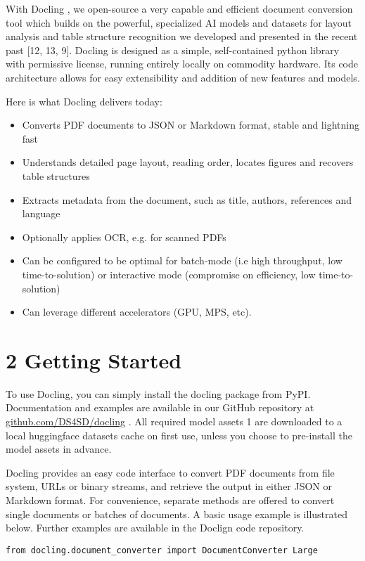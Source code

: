 \documentclass[11pt,a4paper]{article}
\begin{document}
With Docling , we open-source a very capable and efficient document conversion tool which builds on the powerful, specialized AI models and datasets for layout analysis and table structure recognition we developed and presented in the recent past [12, 13, 9]. Docling is designed as a simple, self-contained python library with permissive license, running entirely locally on commodity hardware. Its code architecture allows for easy extensibility and addition of new features and models.

Here is what Docling delivers today:

\begin{itemize}
\item Converts PDF documents to JSON or Markdown format, stable and lightning fast
\item Understands detailed page layout, reading order, locates figures and recovers table structures
\item Extracts metadata from the document, such as title, authors, references and language
\item Optionally applies OCR, e.g. for scanned PDFs
\item Can be configured to be optimal for batch-mode (i.e high throughput, low time-to-solution) or interactive mode (compromise on efficiency, low time-to-solution)
\item Can leverage different accelerators (GPU, MPS, etc).
\end{itemize}

\section{2 Getting Started}

To use Docling, you can simply install the docling package from PyPI. Documentation and examples are available in our GitHub repository at  \href{https://github.com/DS4SD/docling}{github.com/DS4SD/docling} . All required model assets 1 are downloaded to a local huggingface datasets cache on first use, unless you choose to pre-install the model assets in advance.

Docling provides an easy code interface to convert PDF documents from file system, URLs or binary streams, and retrieve the output in either JSON or Markdown format. For convenience, separate methods are offered to convert single documents or batches of documents. A basic usage example is illustrated below. Further examples are available in the Doclign code repository.

\begin{verbatim}
from docling.document_converter import DocumentConverter Large
\end{verbatim}
\end{document}
